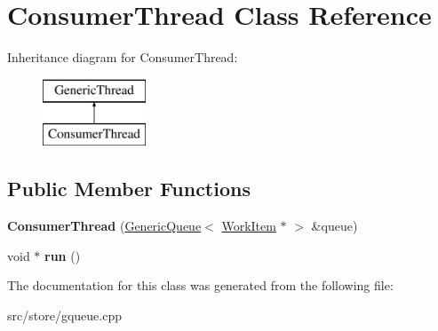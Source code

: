 \hypertarget{classConsumerThread}{\section{Consumer\-Thread Class Reference}
\label{classConsumerThread}
}
Inheritance diagram for Consumer\-Thread\-:\begin{figure}[H]
\begin{center}
\leavevmode
\includegraphics[height=2.000000cm]{classConsumerThread}
\end{center}
\end{figure}
\subsection*{Public Member Functions}
\begin{DoxyCompactItemize}
\item 
\hypertarget{classConsumerThread_a000214667d1ad9d31ce7133f6fbf9aac}{{\bfseries Consumer\-Thread} (\hyperlink{classGenericQueue}{Generic\-Queue}$<$ \hyperlink{classWorkItem}{Work\-Item} $\ast$ $>$ \&queue)}\label{classConsumerThread_a000214667d1ad9d31ce7133f6fbf9aac}

\item 
\hypertarget{classConsumerThread_a8fde7a9b6c2c0b3c62a9fd3c50296557}{void $\ast$ {\bfseries run} ()}\label{classConsumerThread_a8fde7a9b6c2c0b3c62a9fd3c50296557}

\end{DoxyCompactItemize}


The documentation for this class was generated from the following file\-:\begin{DoxyCompactItemize}
\item 
src/store/gqueue.\-cpp\end{DoxyCompactItemize}
